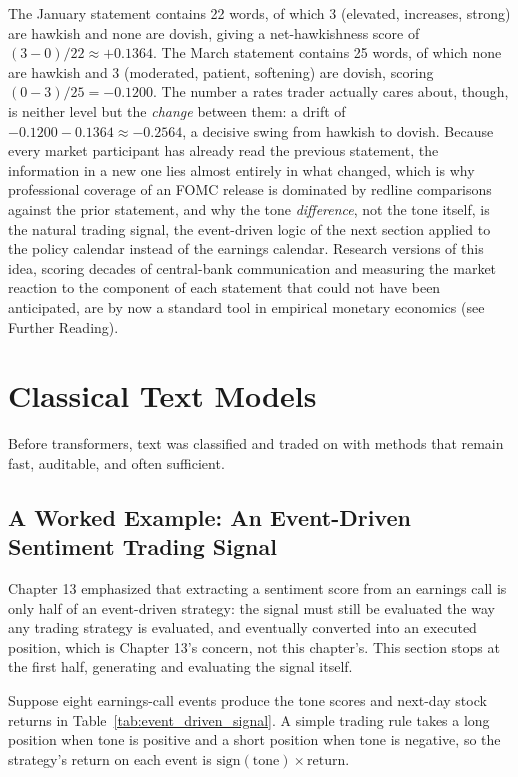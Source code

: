 \documentclass[../ai_in_finance]{subfiles}
\begin{document}
The January statement contains 22 words, of which 3 (elevated, increases, strong) are hawkish and none are dovish, giving a net-hawkishness score of $(3-0)/22 \approx +0.1364$. The March statement contains 25 words, of which none are hawkish and 3 (moderated, patient, softening) are dovish, scoring $(0-3)/25 = -0.1200$. The number a rates trader actually cares about, though, is neither level but the \emph{change} between them: a drift of $-0.1200 - 0.1364 \approx -0.2564$, a decisive swing from hawkish to dovish. Because every market participant has already read the previous statement, the information in a new one lies almost entirely in what changed, which is why professional coverage of an FOMC release is dominated by redline comparisons against the prior statement, and why the tone \emph{difference}, not the tone itself, is the natural trading signal, the event-driven logic of the next section applied to the policy calendar instead of the earnings calendar. Research versions of this idea, scoring decades of central-bank communication and measuring the market reaction to the component of each statement that could not have been anticipated, are by now a standard tool in empirical monetary economics (see Further Reading).

\section{Classical Text Models}

Before transformers, text was classified and traded on with methods that remain fast, auditable, and often sufficient.

\subsection{A Worked Example: An Event-Driven Sentiment Trading Signal}
\label{sec:event-driven-signal}

Chapter 13 emphasized that extracting a sentiment score from an earnings call is only half of an event-driven strategy: the signal must still be evaluated the way any trading strategy is evaluated, and eventually converted into an executed position, which is Chapter 13's concern, not this chapter's. This section stops at the first half, generating and evaluating the signal itself.

Suppose eight earnings-call events produce the tone scores and next-day stock returns in Table~\ref{tab:event_driven_signal}. A simple trading rule takes a long position when tone is positive and a short position when tone is negative, so the strategy's return on each event is $\text{sign}(\text{tone}) \times \text{return}$.
\end{document}
